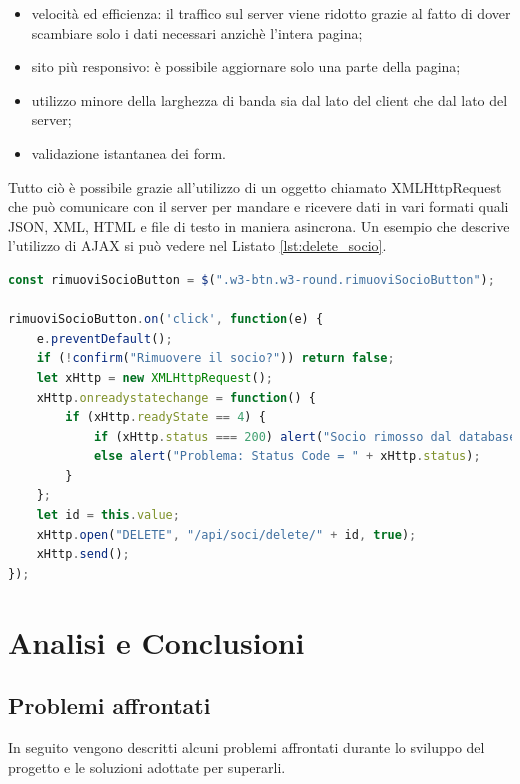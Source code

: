 \documentclass[12pt]{report}
\begin{document}
\begin{itemize}
	\item velocità ed efficienza: il traffico sul server viene ridotto grazie al fatto di dover scambiare solo i dati necessari anzichè l'intera pagina;
	\item sito più responsivo: è possibile aggiornare solo una parte della pagina;
	\item utilizzo minore della larghezza di banda sia dal lato del client che dal lato del server;
	\item validazione istantanea dei form.
\end{itemize}
Tutto ciò è possibile grazie all'utilizzo di un oggetto chiamato XMLHttpRequest che può comunicare con il server per mandare e ricevere dati in vari formati quali JSON, XML, HTML e file di testo in maniera asincrona. Un esempio che descrive l'utilizzo di AJAX si può vedere nel Listato \ref{lst:delete_socio}.
\pagebreak
\begin{lstlisting}[language=JavaScript, morekeywords={ confirm, $, alert }, caption={Tecnica AJAX. La funzione, dopo aver premuto il pulsante per rimuovere un socio, manda una richiesta (nel background) del tipo  \textquotedblleft{} DELETE \textquotedblright{} all'endpoint \emph{/api/soci/delete/} con l'ID del socio che si desidera cancellare}, label={lst:delete_socio}]
const rimuoviSocioButton = $(".w3-btn.w3-round.rimuoviSocioButton");

rimuoviSocioButton.on('click', function(e) {
	e.preventDefault();
	if (!confirm("Rimuovere il socio?")) return false;
	let xHttp = new XMLHttpRequest();
	xHttp.onreadystatechange = function() {
		if (xHttp.readyState == 4) {
			if (xHttp.status === 200) alert("Socio rimosso dal database");
			else alert("Problema: Status Code = " + xHttp.status);
		}
	};
	let id = this.value;
	xHttp.open("DELETE", "/api/soci/delete/" + id, true);
	xHttp.send();
});
\end{lstlisting}

%
% 
\chapter{Analisi e Conclusioni}
\label{cap4}
%

\section{Problemi affrontati}
%

In seguito vengono descritti alcuni problemi affrontati durante lo sviluppo del progetto e le soluzioni adottate per superarli.
\end{document}
